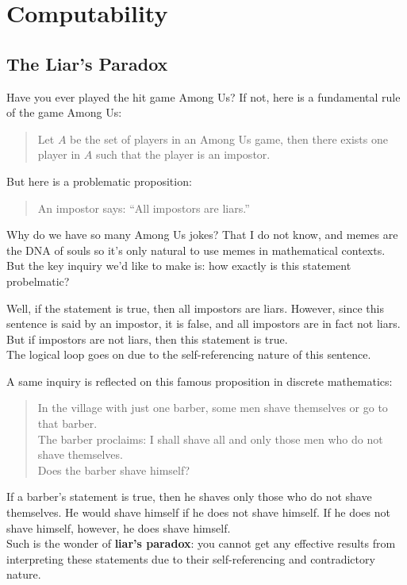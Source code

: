 \chapter{Computability}

\section{The Liar's Paradox}
Have you ever played the hit game Among Us? If not, here is a fundamental rule of the game Among Us:
\begin{quote}
    Let $A$ be the set of players in an Among Us game, then there exists one player in $A$ such that the player is an impostor.
\end{quote}
But here is a problematic proposition:
\begin{quote}
    An impostor says: ``All impostors are liars.''
\end{quote}
Why do we have so many Among Us jokes? That I do not know, and memes are the DNA of souls so it's only natural to use memes in mathematical contexts. \\
But the key inquiry we'd like to make is: how exactly is this statement probelmatic?

Well, if the statement is true, then all impostors are liars. However, since this sentence is said by an impostor, it is false, and all impostors are in fact not liars. But if impostors are not liars, then this statement is true. \\
The logical loop goes on due to the self-referencing nature of this sentence.

A same inquiry is reflected on this famous proposition in discrete mathematics: \\
\begin{quote}
    In the village with just one barber, some men shave themselves or go to that barber. \\
    The barber proclaims: I shall shave all and only those men who do not shave themselves. \\
    Does the barber shave himself?
\end{quote}
If a barber's statement is true, then he shaves only those who do not shave themselves. He would shave himself if he does not shave himself. If he does not shave himself, however, he does shave himself. \\
Such is the wonder of \textbf{liar's paradox}: you cannot get any effective results from interpreting these statements due to their self-referencing and contradictory nature.

